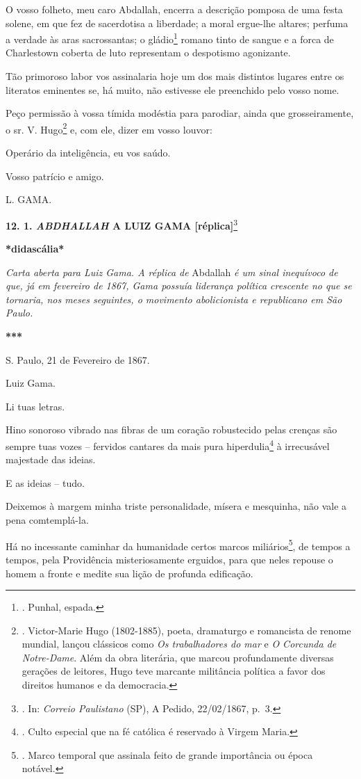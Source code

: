 O vosso folheto, meu caro Abdallah, encerra a descrição pomposa de uma
festa solene, em que fez de sacerdotisa a liberdade; a moral ergue-lhe
altares; perfuma a verdade às aras sacrossantas; o gládio\footnote{.
  Punhal, espada.} romano tinto de sangue e a forca de Charlestown
coberta de luto representam o despotismo agonizante.

Tão primoroso labor vos assinalaria hoje um dos mais distintos lugares
entre os literatos eminentes se, há muito, não estivesse ele preenchido
pelo vosso nome.

Peço permissão à vossa tímida modéstia para parodiar, ainda que
grosseiramente, o sr. V. Hugo\footnote{. Victor-Marie Hugo (1802-1885),
  poeta, dramaturgo e romancista de renome mundial, lançou clássicos
  como \emph{Os trabalhadores do mar} e \emph{O Corcunda de Notre-Dame}.
  Além da obra literária, que marcou profundamente diversas gerações de
  leitores, Hugo teve marcante militância política a favor dos direitos
  humanos e da democracia.} e, com ele, dizer em vosso louvor:

Operário da inteligência, eu vos saúdo.

Vosso patrício e amigo.

L. GAMA.

\textbf{12. 1. \emph{ABDHALLAH} A LUIZ GAMA {[}réplica{]}}\footnote{.
  In: \emph{Correio Paulistano} (SP), A Pedido, 22/02/1867, p.~3.}

\textbf{*didascália*}

\emph{Carta aberta para Luiz Gama. A réplica de} Abdallah \emph{é um
sinal inequívoco de que, já em fevereiro de 1867, Gama possuía liderança
política crescente no que se tornaria, nos meses seguintes, o movimento
abolicionista e republicano em São Paulo.}

\textbf{***}

S. Paulo, 21 de Fevereiro de 1867.

Luiz Gama.

Li tuas letras.

Hino sonoroso vibrado nas fibras de um coração robustecido pelas crenças
são sempre tuas vozes -- fervidos cantares da mais pura
hiperdulia\footnote{. Culto especial que na fé católica é reservado à
  Virgem Maria.} à irrecusável majestade das ideias.

E as ideias -- tudo.

Deixemos à margem minha triste personalidade, mísera e mesquinha, não
vale a pena comtemplá-la.

Há no incessante caminhar da humanidade certos marcos
miliários\footnote{. Marco temporal que assinala feito de grande
  importância ou época notável.}, de tempos a tempos, pela Providência
misteriosamente erguidos, para que neles repouse o homem a fronte e
medite sua lição de profunda edificação.

